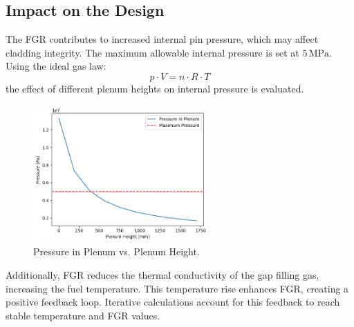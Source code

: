 \subsection{Impact on the Design}

The FGR contributes to increased internal pin pressure, which may affect cladding integrity. The maximum allowable internal pressure is set at $5 \, \text{MPa}$. Using the ideal gas law:
\begin{equation}
    p \cdot V = n \cdot R \cdot T
\end{equation}
the effect of different plenum heights on internal pressure is evaluated.

\begin{figure}[H]
    \centering
    \includegraphics[width=0.6\textwidth]{FGR_3.png}
    \caption{Pressure in Plenum vs. Plenum Height.}
    \label{fig:plenum_pressure}
\end{figure}

Additionally, FGR reduces the thermal conductivity of the gap filling gas, increasing the fuel temperature. This temperature rise enhances FGR, creating a positive feedback loop. Iterative calculations account for this feedback to reach stable temperature and FGR values.
